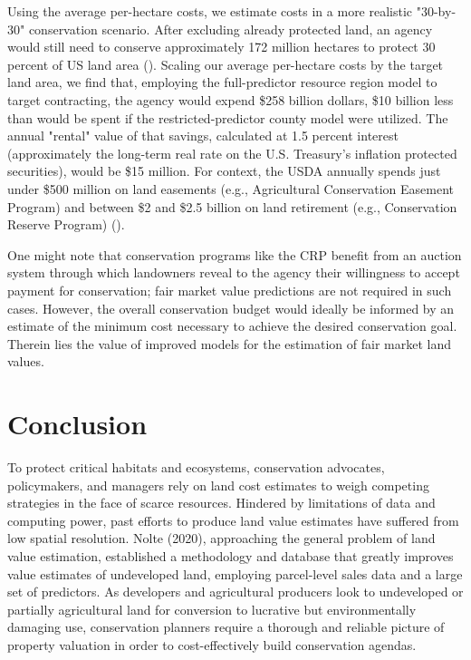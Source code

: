 \documentclass[12pt]{article}
\begin{document}
Using the average per-hectare costs, we estimate costs in a more realistic "30-by-30" conservation scenario. After excluding already protected land, an agency would still need to conserve approximately 172 million hectares to protect 30 percent of US land area (\cite{simmons2021}). Scaling our average per-hectare costs by the target land area, we find that, employing the full-predictor resource region model to target contracting, the agency would expend \$258 billion dollars, \$10 billion less than would be spent if the restricted-predictor county model were utilized. The annual "rental" value of that savings, calculated at 1.5 percent interest (approximately the long-term real rate on the U.S. Treasury's inflation protected securities), would be \$15 million. For context, the USDA annually spends just under \$500 million on land easements (e.g., Agricultural Conservation Easement Program) and between \$2 and \$2.5 billion on land retirement (e.g., Conservation Reserve Program) (\cite{Stubbs2019AgriculturalBill}).

One might note that conservation programs like the CRP benefit from an auction system through which landowners reveal to the agency their willingness to accept payment for conservation; fair market value predictions are not required in such cases. However, the overall conservation budget would ideally be informed by an estimate of the minimum cost necessary to achieve the desired conservation goal. Therein lies the value of improved models for the estimation of fair market land values. 

\section{Conclusion}

To protect critical habitats and ecosystems, conservation advocates, policymakers, and managers rely on land cost estimates to weigh competing strategies in the face of scarce resources. Hindered by limitations of data and computing power, past efforts to produce land value estimates have suffered from low spatial resolution. Nolte (2020), approaching the general problem of land value estimation, established a methodology and database that greatly improves value estimates of undeveloped land, employing parcel-level sales data and a large set of predictors. As developers and agricultural producers look to undeveloped or partially agricultural land for conversion to lucrative but environmentally damaging use, conservation planners require a thorough and reliable picture of property valuation in order to cost-effectively build conservation agendas.
\end{document}
